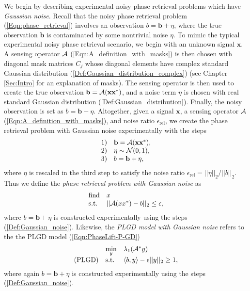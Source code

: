 We begin by describing experimental noisy phase retrieval problems which have \textit{Gaussian noise}.  Recall that the noisy phase retrieval problem (\ref{Eqn:phase_retrieval}) involves an observation $b = \mathbf{b} + \eta$, where the true observation $\mathbf{b}$ is contaminated by some nontrivial noise $\eta$.  To mimic the typical experimental noisy phase retrieval scenario, we begin with an unknown signal $\mathbf{x}$.  A sensing operator ${\mathcal A}$ (\ref{Eqn:A_definition_with_masks}) is then chosen with diagonal mask matrices $C_j$ whose diagonal elements have complex standard Gaussian distribution (\ref{Def:Gaussian_distribution_complex}) (see Chapter \ref{Sec:Intro} for an explanation of masks).  The sensing operator is then used to create the true observation $\mathbf{b} = {\mathcal A}(\mathbf{x}\mathbf{x}^*)$, and a noise term $\eta$ is chosen with real standard Gaussian distribution (\ref{Def:Gaussian_distribution}).  Finally, the noisy observation is set as $b = \mathbf{b} + \eta$.  Altogether, given a signal $\mathbf{x}$, a sensing operator ${\mathcal A}$ (\ref{Eqn:A_definition_with_masks}), and noise ratio $\epsilon_\text{rel}$, we create the phase retrieval problem with Gaussian noise experimentally with the steps
\begin{equation} 			\label{Def:Gaussian_noise}
\begin{array}{ll}
1)	&	\mathbf{b} = {\mathcal A}(\mathbf{x}\mathbf{x}^*) ,\\
2) &	\eta \sim {\mathcal N}(0,1), \\
3) & b = \mathbf{b} + \eta,
\end{array}
\end{equation}
where $\eta$ is rescaled in the third step to satisfy the noise ratio $\epsilon_\text{rel} = ||\eta||_2 / ||b||_2$.  Thus we define the \textit{phase retrieval problem with Gaussian noise} as
\begin{equation} \label{Eqn:phase_retrieval_Gaussian_noise}
\begin{array}{ll}
		\text{find}
		&	x
			\\
		\textnormal{s.t.}
		& 	||{\mathcal A} (xx^*) - b||_2 \leq \epsilon,
\end{array}
\end{equation}
where $b = \mathbf{b} + \eta$ is constructed experimentally using the steps (\ref{Def:Gaussian_noise}).  Likewise, the \textit{PLGD model with Gaussian noise} refers to the the PLGD model (\ref{Eqn:PhaseLift-P-GD}) 
\begin{equation} 			\label{Eqn:PhaseLift-GD_Gaussian_noise}
\begin{array}{lll}
	&\min\limits_{\substack{y}}
					&	\lambda_1({\mathcal A}^* y)
						\\
	\textnormal{(PLGD)}
				&	\textnormal{s.t.}
					&	\langle b, y \rangle - \epsilon ||y||_2 \geq 1,
\end{array}
\end{equation}
where again $b = \mathbf{b} + \eta$ is constructed experimentally using the steps (\ref{Def:Gaussian_noise}).  




